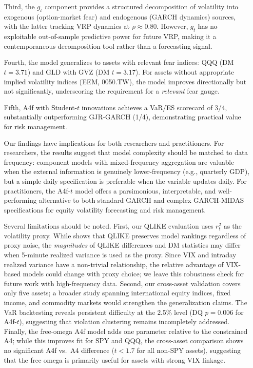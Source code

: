 \documentclass[12pt,a4paper]{article}
\begin{document}
Third, the $g_t$ component provides a structured decomposition of volatility into exogenous (option-market fear) and endogenous (GARCH dynamics) sources, with the latter tracking VRP dynamics at $\rho \approx 0.80$. However, $g_t$ has no exploitable out-of-sample predictive power for future VRP, making it a contemporaneous decomposition tool rather than a forecasting signal.

Fourth, the model generalizes to assets with relevant fear indices: QQQ (DM $t = 3.71$) and GLD with GVZ (DM $t = 3.17$). For assets without appropriate implied volatility indices (EEM, 0050.TW), the model improves directionally but not significantly, underscoring the requirement for a \emph{relevant} fear gauge.

Fifth, A4f with Student-$t$ innovations achieves a VaR/ES scorecard of 3/4, substantially outperforming GJR-GARCH (1/4), demonstrating practical value for risk management.

Our findings have implications for both researchers and practitioners. For researchers, the results suggest that model complexity should be matched to data frequency: component models with mixed-frequency aggregation are valuable when the external information is genuinely lower-frequency (e.g., quarterly GDP), but a simple daily specification is preferable when the variable updates daily. For practitioners, the A4f-$t$ model offers a parsimonious, interpretable, and well-performing alternative to both standard GARCH and complex GARCH-MIDAS specifications for equity volatility forecasting and risk management.

Several limitations should be noted. First, our QLIKE evaluation uses $r_t^2$ as the volatility proxy. While \citet{patton2011} shows that QLIKE preserves model rankings regardless of proxy noise, the \emph{magnitudes} of QLIKE differences and DM statistics may differ when 5-minute realized variance is used as the proxy. Since VIX and intraday realized variance have a non-trivial relationship, the relative advantage of VIX-based models could change with proxy choice; we leave this robustness check for future work with high-frequency data. Second, our cross-asset validation covers only five assets; a broader study spanning international equity indices, fixed income, and commodity markets would strengthen the generalization claims. The VaR backtesting reveals persistent difficulty at the 2.5\% level (DQ $p = 0.006$ for A4f-$t$), suggesting that violation clustering remains incompletely addressed. Finally, the free-omega A4f model adds one parameter relative to the constrained A4; while this improves fit for SPY and QQQ, the cross-asset comparison shows no significant A4f vs.\ A4 difference ($t < 1.7$ for all non-SPY assets), suggesting that the free omega is primarily useful for assets with strong VIX linkage.
\end{document}

